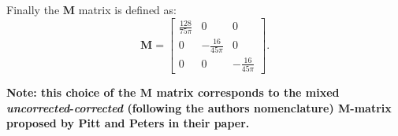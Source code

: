 Finally the $\mathbf{M}$ matrix is defined as:
\begin{equation}\label{eq:Mdef}
\mathbf{M} = \left[
\begin{array}{ccc}
\frac{128}{75 \pi} & 0  & 0 \\
0 & -\frac{16}{45 \pi} & 0 \\
0 & 0 & -\frac{16}{45 \pi}
\end{array}
\right].
\end{equation}

\textbf{Note: this choice of the $\mathbf{M}$ matrix corresponds
to the mixed \emph{uncorrected}-\emph{corrected} (following
the authors nomenclature) M-matrix proposed by Pitt and Peters 
in their paper.}






